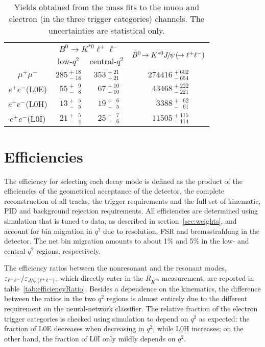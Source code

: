 \documentclass[12pt,a4paper]{article}
\def\mpmm       {\ensuremath{\Pmu^+ \Pmu^-}\xspace}
\def\RKst    {\mbox{R_{\Kstarz}}}
\def\Pmu         {\ensuremath{\upmu}\xspace}
\def\Ppsi        {\ensuremath{\uppsi}\xspace}
\def\PB      {\ensuremath{\mathrm{B}}\xspace}
\def\PJ      {\ensuremath{\mathrm{J}}\xspace}
\def\PK      {\ensuremath{\mathrm{K}}\xspace}
\def\Pe      {\ensuremath{\mathrm{e}}\xspace}
\def\Pmu         {\ensuremath{\mu}\xspace}
\def\Ppsi        {\ensuremath{\psi}\xspace}
\def\PB      {\ensuremath{B}\xspace}
\def\PJ      {\ensuremath{J}\xspace}
\def\PK      {\ensuremath{K}\xspace}
\def\Pe      {\ensuremath{e}\xspace}
\def\epem       {\ensuremath{\Pe^+\Pe^-}\xspace}
\def\ellm       {\ensuremath{\ell^-}\xspace}
\def\ellp       {\ensuremath{\ell^+}\xspace}
\def\kaon  {\ensuremath{\PK}\xspace}
\def\Kstarz  {\ensuremath{\kaon^{*0}}\xspace}
\def\B       {\ensuremath{\PB}\xspace}
\def\Bd      {\ensuremath{\B^0}\xspace}
\def\jpsi     {\ensuremath{{\PJ\mskip -3mu/\mskip -2mu\Ppsi\mskip 2mu}}\xspace}
\newcommand{\decay}[2]{\ensuremath{#1\!\to #2}\xspace}         \def\ra                 {\ensuremath{\rightarrow}\xspace}
\def\to                 {\ensuremath{\rightarrow}\xspace}
\def\qsq       {\ensuremath{q^2}\xspace}
\def\lqsq{low-\qsq}
\def\cqsq{central-\qsq}
\def\loe{\textrm{L0E}\xspace}
\def\loh{\textrm{L0H}\xspace}
\def\loi{\textrm{L0I}\xspace}
\def\RKst{\ensuremath{R_{\Kstarz}}\xspace}
\def\ll{\ensuremath{\ellp\ellm}\xspace}
\def\ellell{\ensuremath{\ellp\ellm}\xspace}
\def\JPsll{\ensuremath{\jpsi(\ellell)}\xspace}
\def\BdToKstll{\mbox{\decay{\Bd}{\Kstarz \ll}}\xspace}
\def\BdToKstJPsll{\mbox{\decay{\Bd}{\Kstarz \jpsi(\decay{}{\ll})}}\xspace}
\begin{document}
\begin{table}[t!]
\centering
\caption{Yields obtained from the mass fits to the muon and electron (in the three trigger categories) channels. The uncertainties are statistical only.} 
\label{tab:yields}
\renewcommand\arraystretch{1.4}
\begin{tabular}{c|c|c|c}
			& \multicolumn{2}{c|}{\BdToKstll}						& \multirow{2}{*}{\BdToKstJPsll} \\ 
\cline{2-3}
			& \lqsq						& \cqsq	& \\ \hline
\mpmm		&  $285~^{+~18}_{-~18}$			&  $353~^{+~21}_{-~21}$	& $274416~^{+~602}_{-~654}$ \\ \hline
\epem (\loe)	&  $\phantom{0}55~^{+~\phantom{0}9}_{-~\phantom{0}8}$	& $\phantom{0}67~^{+~10}_{-~10}$		& $\phantom{0}43468~^{+~222}_{-~221}$ \\
\epem (\loh)	&  $\phantom{0}13~^{+~\phantom{0}5}_{-~\phantom{0}5}$	& $\phantom{0}19~^{+~\phantom{0}6}_{-~\phantom{0}5}$		& $\phantom{00}3388~^{+~\phantom{0}62}_{-~\phantom{0}61}$ \\
\epem (\loi)	&  $\phantom{0}21~^{+~\phantom{0}5}_{-~\phantom{0}4}$	& $\phantom{0}25~^{+~\phantom{0}7}_{-~\phantom{0}6}$		& $\phantom{0}11505~^{+~115}_{-~114}$ \\
\end{tabular}
\end{table}
 

\section{Efficiencies}
\label{sec:eff}

The efficiency for selecting each decay mode is defined as the product of the efficiencies of the geometrical acceptance of the detector, the complete reconstruction of all tracks, the trigger requirements and the full set of kinematic, PID and background rejection requirements. 
All efficiencies are determined using simulation that is tuned to data, as described in section~\ref{sec:weights}, and account for bin migration in \qsq due to resolution, FSR and bremsstrahlung in the detector.
The net bin migration amounts to about 1\% and 5\% in the low- and central-\qsq regions, respectively.

The efficiency ratios between the nonresonant and the resonant modes, $\varepsilon_{\ellell} / \varepsilon_{\JPsll}$, which directly enter in the \RKst measurement, are reported in table~\ref{tab:efficiencyRatio}.
Besides a dependence on the kinematics, the difference between the ratios in the two \qsq regions is almost entirely due to the different requirement on the neural-network classifier.
The relative fraction of the electron trigger categories is checked using simulation to depend on \qsq as expected: the fraction of \loe decreases when decreasing in \qsq, while \loh increases; on the other hand, the fraction of \loi only mildly depends on \qsq.
\end{document}
